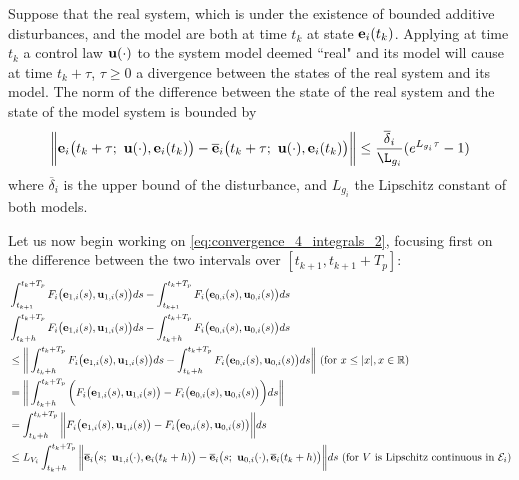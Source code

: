 \begin{bw_box}
  \begin{lemma}
    Suppose that the real system, which is under the existence of bounded
    additive disturbances, and the model are both at time $t_k$ at state
    $\bm{\mathbf{e}}_i(t_k)$. Applying at time $t_k$ a control law $\bm{\mathbf{u}}(\cdot)$
    to the system model deemed ``real" and its model will cause at time $t_k + \tau$,
    $\tau \geq 0$ a divergence between the states of the real system and its
    model. The norm of the difference between the state of the real system
    and the state of the model system is bounded by
    \begin{align}
      \bigg\| \vect{e}_i\big(t_k + \tau;\ \vect{u}(\cdot), \vect{e}_i(t_k)\big) -
        \overline{\vect{e}}_i\big(t_k + \tau;\ \vect{u}(\cdot), \vect{e}_i(t_k)\big) \bigg\|
        \leq \dfrac{\overline{\delta}_i}{\L_{g_i}} (e^{L_{g_i} \tau} - 1)
    \end{align}
    where $\overline{\delta}_i$ is the upper bound of the disturbance,
    and $L_{g_i}$ the Lipschitz constant of both models.
    \label{lemma:diff_state_from_same_conditions}
  \end{lemma}
\end{bw_box}
Let us now begin working on \eqref{eq:convergence_4_integrals_2}, focusing
first on the difference between the two intervals over $[t_{k+1}, t_{k+1} + T_p]$:
\begin{align}
  &\int_{t_{k+1}}^{t_k + T_p} F_i \big(\bm{\mathbf{e}}_{1,i}(s), \bm{\mathbf{u}}_{1,i} (s)\big) d s
    - \int_{t_{k+1}}^{t_k + T_p} F_i \big(\bm{\mathbf{e}}_{0,i}(s), \bm{\mathbf{u}}_{0,i} (s)\big) d s \\
  &\int_{t_k+h}^{t_k + T_p} F_i \big(\bm{\mathbf{e}}_{1,i}(s), \bm{\mathbf{u}}_{1,i} (s)\big) d s
    - \int_{t_k+h}^{t_k + T_p} F_i \big(\bm{\mathbf{e}}_{0,i}(s), \bm{\mathbf{u}}_{0,i} (s)\big) d s \\
  & \leq \bigg\| \int_{t_k+h}^{t_k + T_p} F_i \big(\bm{\mathbf{e}}_{1,i}(s), \bm{\mathbf{u}}_{1,i} (s)\big) d s
    - \int_{t_k+h}^{t_k + T_p} F_i \big(\bm{\mathbf{e}}_{0,i}(s), \bm{\mathbf{u}}_{0,i} (s)\big) d s \bigg\|
    \text{ (for } x \leq |x|, x \in \mathbb{R} \text{)}\\
  & = \bigg\| \int_{t_k+h}^{t_k + T_p} \bigg( F_i \big(\bm{\mathbf{e}}_{1,i}(s), \bm{\mathbf{u}}_{1,i} (s)\big)
    -  F_i \big(\bm{\mathbf{e}}_{0,i}(s), \bm{\mathbf{u}}_{0,i} (s)\big) \bigg) d s \bigg\| \\
  & = \int_{t_k+h}^{t_k + T_p} \bigg\| F_i \big(\bm{\mathbf{e}}_{1,i}(s), \bm{\mathbf{u}}_{1,i} (s)\big)
    -  F_i \big(\bm{\mathbf{e}}_{0,i}(s), \bm{\mathbf{u}}_{0,i} (s)\big) \bigg\| d s \\
  & \leq L_{V_i}\int_{t_k+h}^{t_k + T_p} \bigg\| \overline{\bm{\mathbf{e}}}_i\big(s;\ \bm{\mathbf{u}}_{1,i} (\cdot), \bm{\mathbf{e}}_i(t_k + h) \big)
    -  \overline{\bm{\mathbf{e}}}_i\big(s;\ \bm{\mathbf{u}}_{0,i} (\cdot), \overline{\bm{\mathbf{e}}}_i(t_k + h)\big) \bigg\| d s
    \text{ (for } V \text{ is Lipschitz continuous in } \mathcal{E}_i \text{)}
\end{align}


